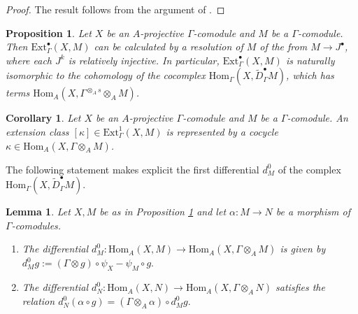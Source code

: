 \documentclass[10pt,a4paper]{amsart}
\newtheorem{prop}[thm]{Proposition}
\newtheorem{cor}[thm]{Corollary}
\newtheorem{lem}[thm]{Lemma}
\theoremstyle{definition}
\theoremstyle{remark}
\newcommand{\cobar}{\tilde{D}}
\renewcommand{\hom}{\mathrm{Hom}}
\newcommand{\ext}{\mathrm{Ext}}
\begin{document}
\begin{proof}
	The result follows from the argument of \cite[Lemma A1.2.8b)]{ravenel_green}.
\end{proof}


\begin{prop}
\label{prop:ext-cobar}
\cite[Lemma A.1.1.6, Corollary A1.2.12]{ravenel_green}
Let $X$ be an $A$-projective  $\Gamma$-comodule and $M$ be a  $\Gamma$-comodule. Then $ \ext^\bullet_\Gamma (X, M)$ can be calculated by a resolution of $M$ of the from $M \rightarrow J^\bullet$, where each $J^k$ is relatively injective.
 In particular, $ \ext^\bullet_\Gamma (X, M)$ is naturally isomorphic to the cohomology
of the cocomplex $\hom_\Gamma (X, \cobar^\bullet_\Gamma M)$, which has terms
$\hom_A (X, \Gamma^{\otimes_A s }\otimes _A M)$.
\end{prop}

\begin{cor}
\label{cor:1-cocycle}
Let  $X$ be an $A$-projective $\Gamma$-comodule and $M$ be a  $\Gamma$-comodule. An
extension class $[\kappa] \in \ext^1 _\Gamma (X, M)$ is represented by a cocycle
$\kappa \in
\hom_A (X, \Gamma \otimes_A M )$.
\end{cor}

The following statement makes explicit the first differential $d^0_M$ of the  complex $\hom_\Gamma (X, \cobar^\bullet_\Gamma M)$.

\begin{lem}
\label{lem:d0}
Let $X, M$ be as in Proposition \ref{prop:ext-cobar} and let $\alpha : M \rightarrow N$ be a morphism of $\Gamma$-comodules.
\begin{enumerate}
	\item
The differential
$d^0_M : \hom_A (X, M) \rightarrow \hom_A (X, \Gamma \otimes_A M )$ is given by
 $
d^0_M g := (\Gamma \otimes g ) \circ \psi_X - \psi_M \circ g.
$
	\item
	The differential
$d^0_N : \hom_A (X, N) \rightarrow \hom_A (X, \Gamma \otimes_A N )$ satisfies the relation
$
d^0_N (\alpha \circ g) = (\Gamma \otimes _A \alpha) \circ d^0_M g.
$
\end{enumerate}
\end{lem}
\end{document}
